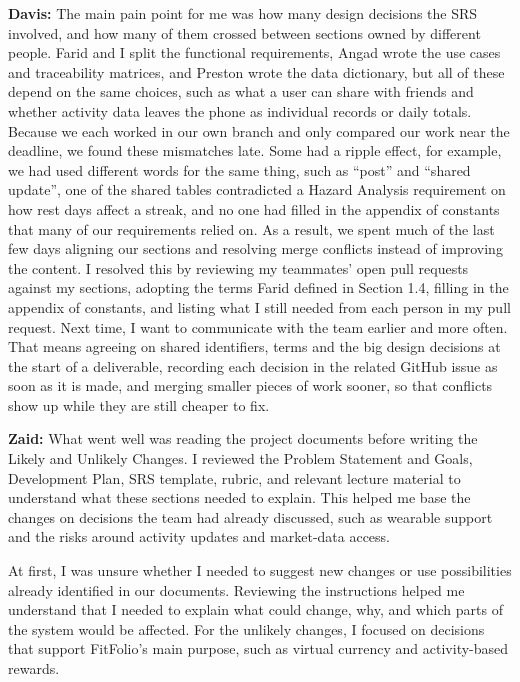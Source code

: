 \documentclass[12pt]{article}
\begin{document}
\bigskip
\noindent
\textbf{Davis:} The main pain point for me was how many design decisions the
SRS involved, and how many of them crossed between sections owned by different
people. Farid and I split the functional requirements, Angad wrote the use cases
and traceability matrices, and Preston wrote the data dictionary, but all of
these depend on the same choices, such as what a user can share with friends
and whether activity data leaves the phone as individual records or daily
totals. Because we each worked in our own branch and only compared our work
near the deadline, we found these mismatches late. Some had a ripple effect,
for example, we had used different words for the same thing, such as ``post''
and ``shared update'', one of the shared tables contradicted a Hazard Analysis
requirement on how rest days affect a streak, and no one had filled in the
appendix of constants that many of our requirements relied on. As a result, we
spent much of the last few days aligning our sections and resolving merge
conflicts instead of improving the content. I resolved this by reviewing my
teammates' open pull requests against my sections, adopting the terms Farid
defined in Section 1.4, filling in the appendix of constants, and listing what
I still needed from each person in my pull request. Next time,
I want to communicate with the team earlier and more often. That means agreeing
on shared identifiers, terms and the big design decisions at the start of a
deliverable, recording each decision in the related GitHub issue as soon as it
is made, and merging smaller pieces of work sooner, so that conflicts show up
while they are still cheaper to fix.

\bigskip
\noindent
\textbf{Zaid:}
What went well was reading the project documents before writing the Likely and Unlikely Changes. I reviewed the Problem Statement and Goals, Development Plan, SRS template, rubric, and relevant lecture material to understand what these sections needed to explain. This helped me base the changes on decisions the team had already discussed, such as wearable support and the risks around activity updates and market-data access.

At first, I was unsure whether I needed to suggest new changes or use possibilities already identified in our documents. Reviewing the instructions helped me understand that I needed to explain what could change, why, and which parts of the system would be affected. For the unlikely changes, I focused on decisions that support FitFolio's main purpose, such as virtual currency and activity-based rewards.
\end{document}
